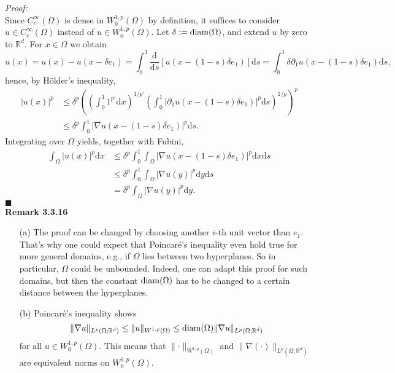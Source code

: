 \textit{Proof:}\\
Since $C_c^\infty(\Omega)$ is dense in $W_0^{1,p}(\Omega)$ by definition, it suffices to consider $u\in C_c^\infty(\Omega)$ instead of $u\in W_0^{1,p}(\Omega)$. Let $\delta:=\operatorname{diam}\mathopen{}\left(\Omega\right)\mathclose{}$, and extend $u$ by zero to $\mathbb{R}^d$. For $x\in\Omega$ we obtain
\[u(x)=u(x)-u(x-\delta e_1)=\int_0^1{\frac{\mathrm{d}}{\mathrm{d}s}[u(x-(1-s)\delta e_1)]\mathrm{d}s}=\int_0^1{\delta\partial_1u(x-(1-s)\delta e_1)\mathrm{d}s},\]
hence, by H\"older's inequality,
\begin{align*}
	\lvert u(x)\rvert^p&\leq\delta^p\left(\left(\int_0^1{1^{p'}\mathrm{d}x}\right)^{1/p'}\left(\int_0^1{\lvert\partial_1u(x-(1-s)\delta e_1)\rvert^{p}\mathrm{d}s}\right)^{1/p}\right)^p\\
	&\leq\delta^p\int_0^1{\lvert\nabla u(x-(1-s)\delta e_1)\rvert^p\mathrm{d}s}.
\end{align*}
Integrating over $\Omega$ yields, together with Fubini,
\begin{align*}
	\int_\Omega{\lvert u(x)\rvert^p\mathrm{d}x}&\leq\delta^p\int_0^1{\int_\Omega{\lvert\nabla u(x-(1-s)\delta e_1)\rvert^p\mathrm{d}x}\mathrm{d}s}\\
	&\leq\delta^p\int_0^1{\int_\Omega{\lvert\nabla u(y)\rvert^p\mathrm{d}y}\mathrm{d}s}\\
	&=\delta^p\int_\Omega{\lvert\nabla u(y)\rvert^p\mathrm{d}y}.
\end{align*}
\hfill$\blacksquare$\\[11pt]

\textbf{Remark 3.3.16}
\begin{itemize}
	\item[(a)] The proof can be changed by choosing another $i$-th unit vector than $e_1$. That's why one could expect that Poincar\'e's inequality even hold true for more general domains, e.g., if $\Omega$ lies between two hyperplanes. So in particular, $\Omega$ could be unbounded. Indeed, one can adapt this proof for such domains, but then the constant $\operatorname{diam}\mathopen{}\left(\Omega\right)\mathclose{}$ has to be changed to a certain distance between the hyperplanes.
	\item[(b)] Poincar\'e's inequality shows
	\[\lVert\nabla u\rVert_{L^p(\Omega;\mathbb{R}^d)}\leq\lVert u\rVert_{W^{1,p}(\Omega)}\leq\operatorname{diam}\mathopen{}\left(\Omega\right)\mathclose{}\lVert\nabla u\rVert_{L^p(\Omega;\mathbb{R}^d)}\]
	for all $u\in W_0^{1,p}(\Omega)$. This means that $\lVert\cdot\rVert_{W^{1,p}(\Omega)}$ and $\lVert\nabla(\cdot)\rVert_{L^p(\Omega;\mathbb{R}^d)}$ are equivalent norms on $W_0^{1,p}(\Omega)$.
\end{itemize}
\leavevmode